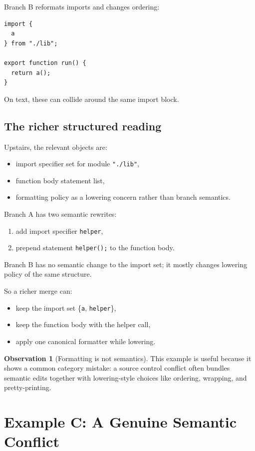\documentclass[11pt]{article}
\theoremstyle{definition}
\newtheorem{observation}{Observation}
\begin{document}
Branch B reformats imports and changes ordering:

\begin{verbatim}
import {
  a
} from "./lib";

export function run() {
  return a();
}
\end{verbatim}

On text, these can collide around the same import block.

\subsection{The richer structured reading}

Upstairs, the relevant objects are:
\begin{itemize}[leftmargin=2em]
\item import specifier set for module \texttt{"./lib"},
\item function body statement list,
\item formatting policy as a lowering concern rather than branch semantics.
\end{itemize}

Branch A has two semantic rewrites:
\begin{enumerate}[leftmargin=2em]
\item add import specifier \texttt{helper},
\item prepend statement \texttt{helper();} to the function body.
\end{enumerate}

Branch B has no semantic change to the import set; it mostly changes lowering
policy of the same structure.

So a richer merge can:
\begin{itemize}[leftmargin=2em]
\item keep the import set \{\texttt{a}, \texttt{helper}\},
\item keep the function body with the helper call,
\item apply one canonical formatter while lowering.
\end{itemize}

\begin{observation}[Formatting is not semantics]
This example is useful because it shows a common category mistake: a source
control conflict often bundles semantic edits together with lowering-style
choices like ordering, wrapping, and pretty-printing.
\end{observation}

\section{Example C: A Genuine Semantic Conflict}
\end{document}
